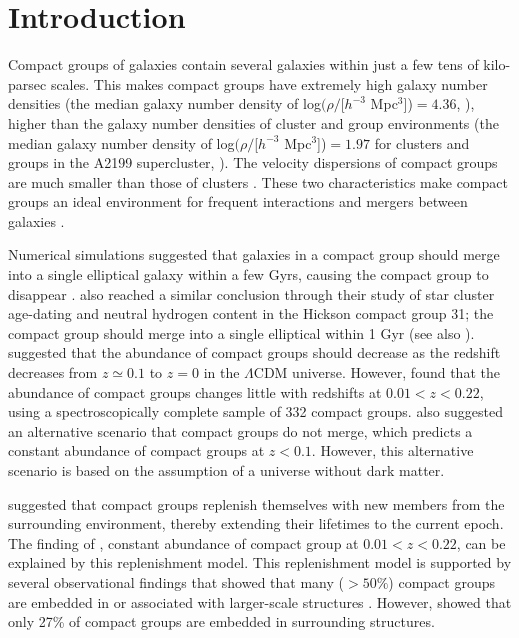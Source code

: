 \documentclass[12pt,preprint,apj]{emulateapj}
\newcommand{\kms}{{\rm km~s^{-1}}}
\begin{document}


\section{Introduction}

Compact groups of galaxies contain several galaxies within just a few
tens of kilo-parsec scales.
This makes compact groups have extremely high
galaxy number densities (the median galaxy number density of 
log$(\rho /$[$h^{-3}$ Mpc$^3$])$=4.36$, \citealp{sohn+16}), higher than 
the galaxy number densities of cluster and group environments 
(the median galaxy number density of 
log$(\rho /$[$h^{-3}$ Mpc$^3$])$=1.97$ for clusters and groups in the 
A2199 supercluster, \citealp{lee+15,sohn+15}).
The velocity dispersions of compact groups 
are much smaller \citep[$< 879~\kms$ 
with a median value of $194~\kms$ with a standard deviation of 
$156~\kms$,][Table 7]{sohn+16} than 
those of clusters \citep[$\sim$400$-1300~\kms$ with a median value of $778~\kms$ and a standard deviation of $208~\kms$,][]{rines+13}.
These two characteristics make compact groups 
an ideal environment for frequent interactions 
and mergers between galaxies \citep[e.g.,][]{rubin+90,rodrigue+95,amram+07,coziol+07,plauchu+10,gallagher+10,konstantopoulos+12,sohn+13,vogt+15}. 

Numerical simulations suggested that galaxies in a compact group
should merge into a single elliptical galaxy within a few Gyrs, 
causing the compact group to disappear \citep{barnes85,barnes89,mamon87}. 
\citet{gallagher+10} also reached a similar conclusion through their study 
of star cluster age-dating and neutral hydrogen content in the Hickson compact 
group 31; the compact group should merge into a single elliptical within 1 Gyr
(see also \citealt{rubin+90}).
\citet{kroupa15} suggested that the abundance of compact groups should 
decrease as the redshift decreases from 
$z\simeq0.1$ to $z=0$ in the $\Lambda$CDM
universe. However, \citet{sohn+15} found that the abundance of 
compact groups changes little with redshifts at $0.01<z<0.22$, using 
a spectroscopically complete sample of 332 compact groups.  
\citet{kroupa15} also suggested an alternative scenario that 
compact groups do not merge, which predicts a constant abundance of 
compact groups at $z<0.1$. However, this alternative scenario is based on 
the assumption of a universe without dark matter.

\citet{diaferio+94} suggested that compact groups 
replenish themselves with new members from the surrounding environment, 
thereby extending their lifetimes to the current epoch. 
The finding of \citet{sohn+15}, constant abundance of compact group 
at $0.01<z<0.22$, can be explained by this replenishment model.
This replenishment model is supported by several observational findings 
that showed that many ($>50\%$) compact groups are embedded in or associated with 
larger-scale structures 
\citep{rood+94,ramella+94,decarvalho+94,ribeiro+98,mendel+11,pompei+12}. 
However, \citet{diaz+15} showed that only 27\% of compact groups 
are embedded in surrounding structures.
\end{document}
